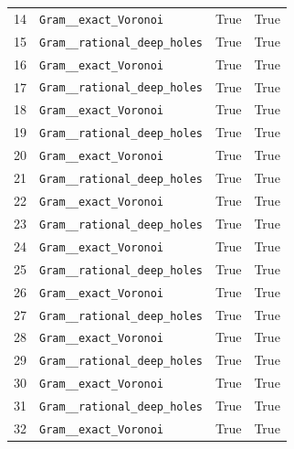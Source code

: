 \documentclass[12pt]{amsart}
\theoremstyle{remark}
\theoremstyle{definition}
\numberwithin{equation}{section}
\begin{document}
\begin{longtable}{rL{11cm}cc}
14 & \texttt{Gram\_\_\allowbreak exact\_\allowbreak Voronoi} & True & True \\
15 & \texttt{Gram\_\_\allowbreak rational\_\allowbreak deep\_\allowbreak holes} & True & True \\
16 & \texttt{Gram\_\_\allowbreak exact\_\allowbreak Voronoi} & True & True \\
17 & \texttt{Gram\_\_\allowbreak rational\_\allowbreak deep\_\allowbreak holes} & True & True \\
18 & \texttt{Gram\_\_\allowbreak exact\_\allowbreak Voronoi} & True & True \\
19 & \texttt{Gram\_\_\allowbreak rational\_\allowbreak deep\_\allowbreak holes} & True & True \\
20 & \texttt{Gram\_\_\allowbreak exact\_\allowbreak Voronoi} & True & True \\
21 & \texttt{Gram\_\_\allowbreak rational\_\allowbreak deep\_\allowbreak holes} & True & True \\
22 & \texttt{Gram\_\_\allowbreak exact\_\allowbreak Voronoi} & True & True \\
23 & \texttt{Gram\_\_\allowbreak rational\_\allowbreak deep\_\allowbreak holes} & True & True \\
24 & \texttt{Gram\_\_\allowbreak exact\_\allowbreak Voronoi} & True & True \\
25 & \texttt{Gram\_\_\allowbreak rational\_\allowbreak deep\_\allowbreak holes} & True & True \\
26 & \texttt{Gram\_\_\allowbreak exact\_\allowbreak Voronoi} & True & True \\
27 & \texttt{Gram\_\_\allowbreak rational\_\allowbreak deep\_\allowbreak holes} & True & True \\
28 & \texttt{Gram\_\_\allowbreak exact\_\allowbreak Voronoi} & True & True \\
29 & \texttt{Gram\_\_\allowbreak rational\_\allowbreak deep\_\allowbreak holes} & True & True \\
30 & \texttt{Gram\_\_\allowbreak exact\_\allowbreak Voronoi} & True & True \\
31 & \texttt{Gram\_\_\allowbreak rational\_\allowbreak deep\_\allowbreak holes} & True & True \\
32 & \texttt{Gram\_\_\allowbreak exact\_\allowbreak Voronoi} & True & True \\

\end{longtable}
\end{document}

